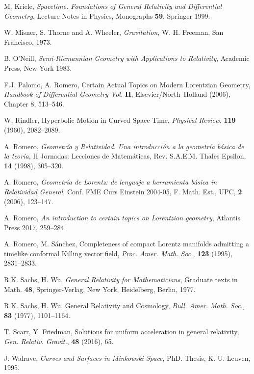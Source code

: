 \documentclass[11pt]{book}
\begin{document}
\begin{thebibliography}{999}
 M. Kriele, {\it Spacetime. Foundations of General Relativity and Differential Geometry}, Lecture Notes in Physics, Monographs {\bf 59}, Springer 1999.
	
 W. Misner, S. Thorne and A. Wheeler, {\it Gravitation}, W. H. Freeman, San Francisco, 1973.
		
 B. O'Neill, {\it Semi-Riemannian Geometry with Applications to Relativity}, Academic Press, New York 1983.

 F.J. Palomo, A. Romero, Certain Actual Topics on Modern Lorentzian Geometry, {\it Handbook of Differential Geometry Vol.} {\bf II}, Elsevier/North–Holland (2006), Chapter 8, 513--546.
	
 W. Rindler, Hyperbolic Motion in Curved Space Time, {\it Physical Review}, {\bf 119} (1960), 2082--2089.
	
 A. Romero, {\it Geometría y Relatividad. Una introducción a la geometría básica de la teoría}, II Jornadas: Lecciones de Matemáticas, Rev. S.A.E.M. Thales Epsilon, {\bf 14} (1998), 305--320.
	
 A. Romero, {\it Geometría de Lorentz: de lenguaje a herramienta básica in Relatividad General}, Conf. FME Curs Einstein 2004-05, F. Math. Est., UPC, {\bf 2} (2006), 123--147.
	
 A. Romero, {\it An introduction to certain topics on Lorentzian geometry}, Atlantis Press 2017,  259--284.

 A. Romero, M. S\'anchez, Completeness of compact Lorentz manifolds admitting
a timelike conformal Killing vector field, {\it Proc. Amer. Math. Soc.}, {\bf 123} (1995), 
2831--2833.
	
 R.K. Sachs, H. Wu, {\it General Relativity for Mathematicians}, Graduate texts in Math. {\bf 48}, Springer-Verlag, New York, Heidelberg, Berlin, 1977.

 R.K. Sachs, H. Wu, General Relativity and Cosmology, {\it Bull. Amer. Math. Soc.,} \textbf{83} (1977), 1101--1164.

 T. Scarr, Y. Friedman, Solutions for uniform acceleration in general relativity, {\it Gen. Relativ. Gravit.}, {\bf 48} (2016), 65.
	
 J. Walrave, {\it Curves and Surfaces in Minkowski Space}, PhD. Thesis, K. U. Leuven, 1995.
\end{thebibliography}
\end{document}
